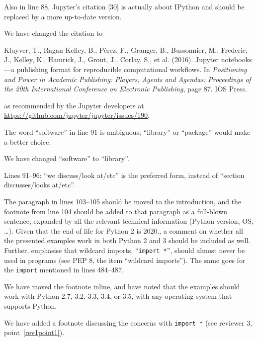 \documentclass[answers,12pt]{exam}
\begin{document}
\begin{questions}
\question Also in line 88, Jupyter's citation [30] is actually about IPython and should be replaced by a more up-to-date version.
\begin{solution}
We have changed the citation to

Kluyver, T., Ragan-Kelley, B., P{\'e}rez, F.,
Granger, B., Bussonnier, M., Frederic, J., Kelley, K., Hamrick, J., Grout,
J., Corlay, S., et al. (2016). Jupyter notebooks---a publishing format for
reproducible computational workflows. In \textit{Positioning and Power in Academic
Publishing: Players, Agents and Agendas: Proceedings of the 20th International
Conference on Electronic Publishing}, page 87. IOS Press.

as recommended by the Jupyter developers at \url{https://github.com/jupyter/jupyter/issues/190}.
\end{solution}

\question The word ``software'' in line 91 is ambiguous; ``library'' or ``package'' would make a better choice.
\begin{solution}
We have changed ``software'' to ``library''.
\end{solution}

\question Lines 91--96: ``we discuss/look at/etc'' is the preferred form, instead of ``section discusses/looks at/etc''.
\begin{solution}
\end{solution}

\question The paragraph in lines 103--105 should be moved to the introduction,
and the footnote from line 104 should be added to that paragraph as a
full-blown sentence, expanded by all the relevant technical information
(Python version, OS, \ldots). Given that the end of life for Python 2 is
2020., a comment on whether all the presented examples work in both Python 2
and 3 should be included as well. Further, emphasise that wildcard imports,
``\texttt{import *}'', should almost never be used in programs (see PEP 8, the
item ``wildcard imports''). The same goes for the \texttt{import} mentioned in lines 484--487.
\begin{solution}
We have moved the footnote inline, and have noted that the examples should
work with Python 2.7, 3.2, 3.3, 3.4, or 3.5, with any operating system that
supports Python.

We have added a footnote discussing the concerns with \texttt{import *} (see
reviewer 3, point~\ref{rev1point1}).
\end{solution}


\end{questions}
\end{document}
